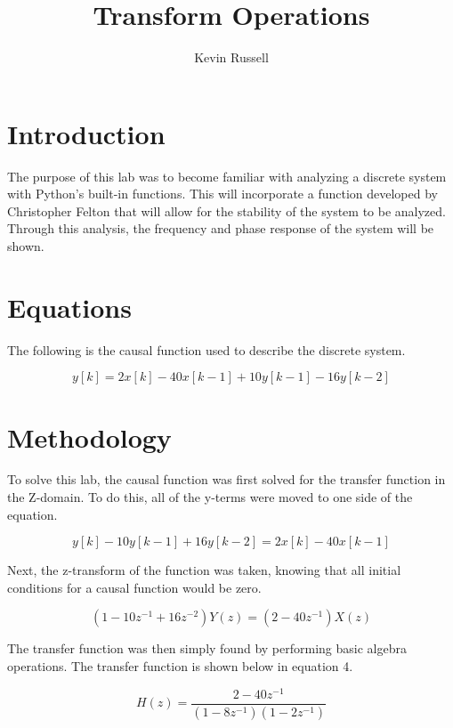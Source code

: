 \documentclass[12pt, titlepage]{article}
\author{Kevin Russell}
\title{Transform Operations}
\date{\parbox{\linewidth}{\centering%
  \experimentDate
  \endgraf\bigskip
  \className\ -- Section \sectionNumber\
}}
\begin{document}
 \newpage
	    \maketitle
\newpage
    \tableofcontents
    
\newpage
    \section{Introduction}    
    The purpose of this lab was to become familiar with analyzing a discrete system with Python's built-in functions.  This will incorporate a function developed by Christopher Felton that will allow for the stability of the system to be analyzed. Through this analysis, the frequency and phase response of the system will be shown.
    
    \section{Equations}
    The following is the causal function used to describe the discrete system.
    
    \begin{equation}
        y[k] = 2x[k]-40x[k-1]+10y[k-1]-16y[k-2]
    \end{equation}
    
    \section{Methodology}
    To solve this lab, the causal function was first solved for the transfer function in the Z-domain.  To do this, all of the y-terms were moved to one side of the equation.
    
    \begin{equation}
        y[k] - 10y[k-1]+16y[k-2]= 2x[k]-40x[k-1]
    \end{equation}
    
    Next, the z-transform of the function was taken, knowing that all initial conditions for a causal function would be zero.
    
    \begin{equation}
        (1-10z^{-1}+16z^{-2})Y(z) = (2 - 40z^{-1})X(z)
    \end{equation}
    
    The transfer function was then simply found by performing basic algebra operations.  The transfer function is shown below in equation 4.
    
    \begin{equation}
        H(z) = \frac{2 - 40z^{-1}}{(1-8z^{-1})(1-2z^{-1})}
    \end{equation}
    
\end{document}
